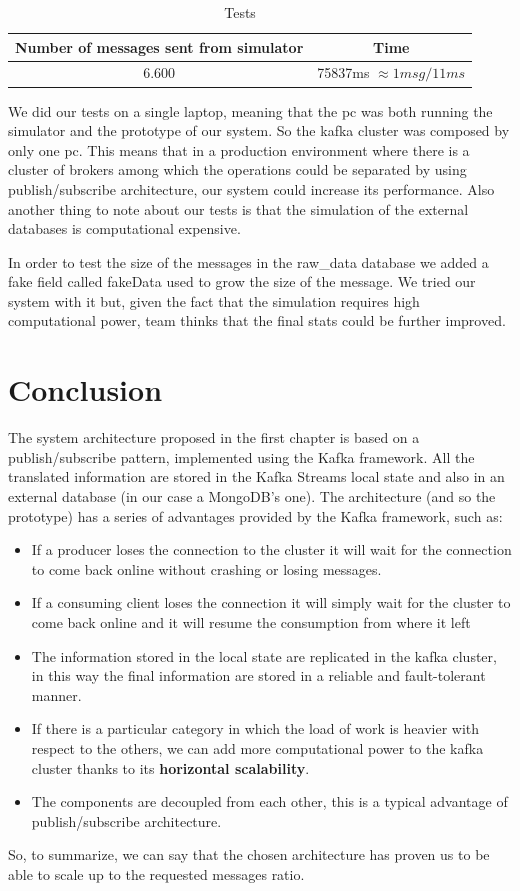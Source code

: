 \begin{table}[H]
\caption{Tests}
\centering
\begin{tabular}{ |c|c| } \hline
\textbf{Number of messages sent from simulator} & \textbf{Time} \\ \hline
6.600 & 75837ms $\approx 1 msg/11ms $ \\ \hline
\end{tabular}
\label{table1}
\end{table}
We did our tests on a single laptop, meaning that the pc was both running the simulator and the prototype of our system. So the kafka cluster was composed by only one pc. This means that in a production environment where there is a cluster of brokers among which the operations could be separated by using publish/subscribe architecture, our system could increase its performance. Also another thing to note about our tests is that the simulation of the external databases is computational expensive.

In order to test the size of the messages in the raw\_data database we added a fake field called fakeData used to grow the size of the message. We tried our system with it but, given the fact that the simulation requires high computational power, team thinks that the final stats could be further improved.


\section{Conclusion}

The system architecture proposed in the first chapter is based on a publish/subscribe pattern, implemented using the Kafka framework.
All the translated information are stored in the Kafka Streams local state and also in an external database (in our case a MongoDB's one).
The architecture (and so the prototype) has a series of advantages provided by the Kafka framework, such as:
\begin{itemize}
    \item If a producer loses the connection to the cluster it will wait for the connection to come back online without crashing or losing messages.
    \item If a consuming client loses the connection it will simply wait for the cluster to come back online and it will resume the consumption from where it left
    \item The information stored in the local state are replicated in the kafka cluster, in this way the final information are stored in a reliable and fault-tolerant manner.
    \item If there is a particular category in which the load of work is heavier with respect to the others, we can add more computational power to the kafka cluster thanks to its \textbf{horizontal scalability}.
    \item The components are decoupled from each other, this is a typical advantage of publish/subscribe architecture.
\end{itemize}

So, to summarize, we can say that the chosen architecture has proven us to be able to scale up to the requested messages ratio.